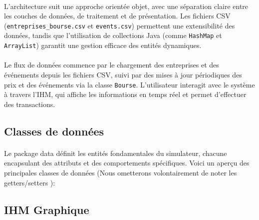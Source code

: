 

\paragraph{}L'architecture suit une approche orientée objet, avec une séparation claire entre les couches de données, de traitement et de présentation. Les fichiers CSV (\texttt{entreprises\_bourse.csv} et \texttt{events.csv}) permettent une extensibilité des données, tandis que l'utilisation de collections Java (comme \texttt{HashMap} et \texttt{ArrayList}) garantit une gestion efficace des entités dynamiques.


\paragraph{}Le flux de données commence par le chargement des entreprises et des événements depuis les fichiers CSV, suivi par des mises à jour périodiques des prix et des événements via la classe \texttt{Bourse}. L'utilisateur interagit avec le système à travers l'IHM, qui affiche les informations en temps réel et permet d'effectuer des transactions.

\subsection{Classes de données}

\paragraph{} Le package data définit les entités fondamentales du simulateur, chacune encapsulant des attributs et des
comportements spécifiques. Voici un aperçu des principales classes de données (Nous ometterons volontairement de noter les getters/setters ):


\subsection{IHM Graphique}

